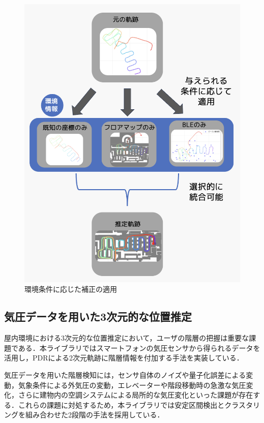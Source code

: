 \documentclass[a4paper, 10pt, twocolumn]{jarticle}
\begin{document}
\begin{figure}[h]
    \centering
    \includegraphics[width=\linewidth]{../image/integrate4.jpg}
    \caption{環境条件に応じた補正の適用}
    \label{fig:corrector-class}
\end{figure}


\subsection{気圧データを用いた3次元的な位置推定}

屋内環境における3次元的な位置推定において，ユーザの階層の把握は重要な課題である．本ライブラリではスマートフォンの気圧センサから得られるデータを活用し，PDRによる2次元軌跡に階層情報を付加する手法を実装している．

気圧データを用いた階層検知には，センサ自体のノイズや量子化誤差による変動，気象条件による外気圧の変動，エレベーターや階段移動時の急激な気圧変化，さらに建物内の空調システムによる局所的な気圧変化といった課題が存在する．これらの課題に対処するため，本ライブラリでは安定区間検出とクラスタリングを組み合わせた2段階の手法を採用している．
\end{document}
